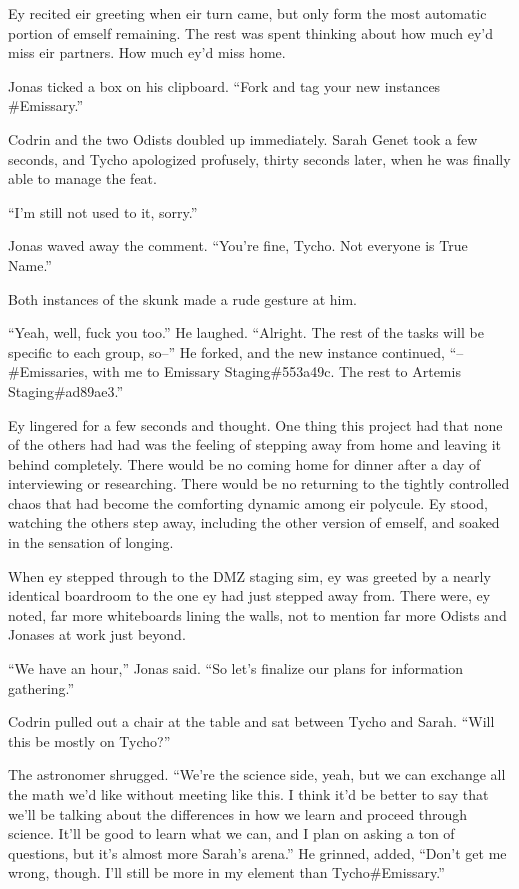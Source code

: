 Ey recited eir greeting when eir turn came, but only form the most automatic portion of emself remaining. The rest was spent thinking about how much ey'd miss eir partners. How much ey'd miss home.

Jonas ticked a box on his clipboard. ``Fork and tag your new instances \#Emissary.''

Codrin and the two Odists doubled up immediately. Sarah Genet took a few seconds, and Tycho apologized profusely, thirty seconds later, when he was finally able to manage the feat.

``I'm still not used to it, sorry.''

Jonas waved away the comment. ``You're fine, Tycho. Not everyone is True Name.''

Both instances of the skunk made a rude gesture at him.

``Yeah, well, fuck you too.'' He laughed. ``Alright. The rest of the tasks will be specific to each group, so--'' He forked, and the new instance continued, ``--\#Emissaries, with me to Emissary Staging\#553a49c. The rest to Artemis Staging\#ad89ae3.''

Ey lingered for a few seconds and thought. One thing this project had that none of the others had had was the feeling of stepping away from home and leaving it behind completely. There would be no coming home for dinner after a day of interviewing or researching. There would be no returning to the tightly controlled chaos that had become the comforting dynamic among eir polycule. Ey stood, watching the others step away, including the other version of emself, and soaked in the sensation of longing.

When ey stepped through to the DMZ staging sim, ey was greeted by a nearly identical boardroom to the one ey had just stepped away from. There were, ey noted, far more whiteboards lining the walls, not to mention far more Odists and Jonases at work just beyond.

``We have an hour,'' Jonas said. ``So let's finalize our plans for information gathering.''

Codrin pulled out a chair at the table and sat between Tycho and Sarah. ``Will this be mostly on Tycho?''

The astronomer shrugged. ``We're the science side, yeah, but we can exchange all the math we'd like without meeting like this. I think it'd be better to say that we'll be talking about the differences in how we learn and proceed through science. It'll be good to learn what we can, and I plan on asking a ton of questions, but it's almost more Sarah's arena.'' He grinned, added, ``Don't get me wrong, though. I'll still be more in my element than Tycho\#Emissary.''

